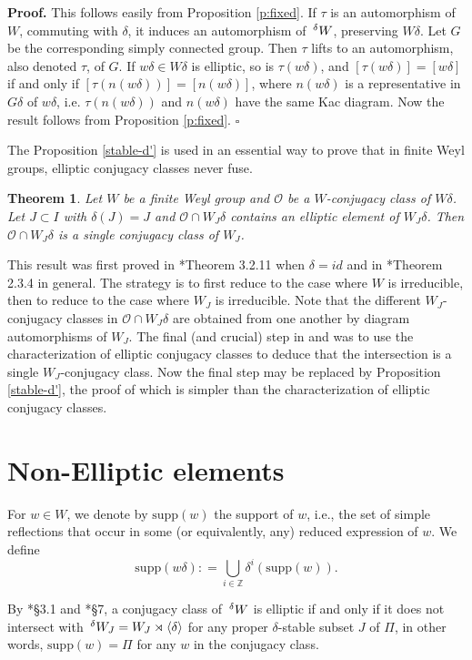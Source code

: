 \documentclass[10pt,leqno]{article}
\newtheorem{theorem}[equation]{Theorem}
\newcommand{\qed}{\hfill $\square$ \medskip}
\newenvironment{proof}[1][Proof]{\noindent\textbf{#1.} }{\qed}
\renewcommand{\sec}[1]{\section{#1}
\renewcommand{\theequation}{\thesection.\arabic{equation}}
  \setcounter{equation}{0}}
\newcommand{\Wext}{\negthinspace\negthinspace\phantom{a}^\delta W}
\def\d{\delta}
\renewcommand{\sec}[1]{\section{#1}
\renewcommand{\theequation}{\thesection.\arabic{equation}}
  \setcounter{equation}{0}}
\begin{document}
\begin{proof}
  This follows easily from Proposition \ref{p:fixed}. If $\tau$ is an
  automorphism of $W$, commuting with $\delta$, it induces an
  automorphism of $\Wext$, preserving $W\delta$. Let $G$ be the corresponding simply connected group.
  Then $\tau$ lifts to an automorphism, also denoted $\tau$, of $G$.
  If $w\delta\in W\delta$ is elliptic, so is $\tau(w\delta)$, and
  $[\tau(w\delta)]=[w\delta]$ if and only if $[\tau(n(w\delta))]=[n(w\delta)]$, where $n(w\delta)$ is a representative
  in $G\delta$ of $w\delta$, i.e. $\tau(n(w\delta))$ and $n(w\delta)$ have the same Kac diagram.
  Now the result follows from Proposition \ref{p:fixed}.
\end{proof}

The Proposition \ref{stable-d'} is used in an essential way to prove that in finite Weyl groups, elliptic conjugacy classes never fuse. 

\begin{theorem}\label{fuse}
	Let $W$ be a finite Weyl group and $\mathcal O$ be a $W$-conjugacy class of $W \d$. Let $J \subset I$ with $\d(J)=J$ and $\mathcal O \cap W_J \d$ contains an elliptic element of $W_J \d$. Then $\mathcal O \cap W_J \d$ is a single conjugacy class of $W_J$. 
\end{theorem}

This result was first proved in \cite{geck_pfeiffer}*{Theorem 3.2.11} when $\d=id$ and in
\cite{CH}*{Theorem 2.3.4} in general. The strategy is to first reduce to the case where $W$ is irreducible, then to reduce to the case where $W_J$ is irreducible. Note that the different $W_J$-conjugacy classes in $\mathcal O \cap W_J \d$ are obtained from one another by diagram automorphisms of $W_J$. The final (and crucial) step in \cite{geck_pfeiffer} and \cite{CH} was to use the characterization of elliptic conjugacy classes to deduce that the intersection is a single $W_J$-conjugacy class. Now the final step may be replaced by Proposition \ref{stable-d'}, the proof of which is simpler than the characterization of elliptic conjugacy classes. 

\sec{Non-Elliptic elements}
\label{s:nonelliptic}

For $w \in W$, we denote by $\text{supp}(w)$ the support of $w$, i.e., the set of simple reflections that occur in some (or equivalently, any) reduced expression of $w$. We define $$\text{supp}(w\delta): =\bigcup_{i \in \mathbb Z} \delta^i(\text{supp}(w)).$$ 

By \cite{geck_pfeiffer}*{\S 3.1} and
\cite{he_minimal_length_double_cosets}*{\S 7}, a conjugacy class of $\Wext$ is
elliptic if and only if it does not intersect with
$\Wext_J=W_J \rtimes \langle \delta \rangle$ for any proper
$\delta$-stable subset $J$ of $\Pi$, in other words,
$\text{supp}(w)=\Pi$ for any $w$ in the conjugacy class.
\end{document}

